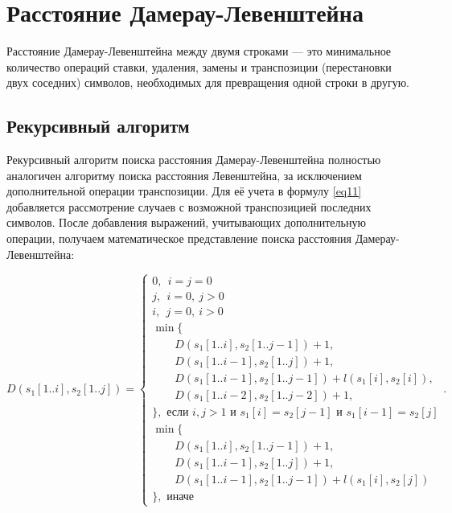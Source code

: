 \section{Расстояние Дамерау-Левенштейна}

Расстояние Дамерау-Левенштейна\cite{bib01} между двумя строками --- это
минимальное количество операций ставки, удаления, замены и транспозиции
(перестановки двух соседних) символов, необходимых для превращения одной строки
в другую.

\subsection{Рекурсивный алгоритм}

Рекурсивный алгоритм поиска расстояния Дамерау-Левенштейна полностью аналогичен
алгоритму поиска расстояния Левенштейна, за исключением дополнительной операции
транспозиции. Для её учета в формулу \ref{eq11} добавляется рассмотрение
случаев с возможной транспозицией последних символов. После добавления
выражений, учитывающих дополнительную операции, получаем математическое
представление поиска расстояния Дамерау-Левенштейна:

{\small
\begin{equation}\label{eq13}
D(s_1[1..i],s_2[1..j]) =
    \begin{cases}
        0,~~i=j=0\\
        j,~~i=0,~j>0\\
        i,~~j=0,~i>0\\
        \min \{\\
         \qquad D(s_1[1..i],s_2[1..j - 1])+1,\\
         \qquad D(s_1[1..i-1],s_2[1..j])+1,\\
         \qquad D(s_1[1..i-1],s_2[1..j-1]) + l(s_1[i],s_2[i]), \\
         \qquad D(s_1[1..i-2],s_2[1..j-2]) + 1,\\
        \}, \text{ если } i,j > 1 \text{ и } s_1[i]=s_2[j-1] \text{ и }
            s_1[i-1]=s_2[j]\\
        \min \{\\
         \qquad D(s_1[1..i],s_2[1..j-1]) + 1,\\
         \qquad D(s_1[1..i-1],s_2[1..j]) + 1,\\
         \qquad D(s_1[1..i-1],s_2[1..j-1]) + l(s_1[i], s_2[j])\\
        \}, \text{ иначе}
    \end{cases}.
\end{equation}
}

